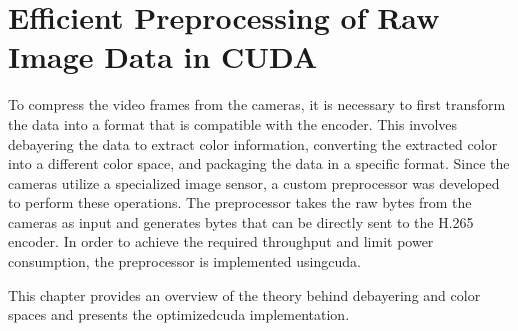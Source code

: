 \chapter{Efficient Preprocessing of Raw Image Data in CUDA}
\label{chap:debayer}

To compress the video frames from the cameras, it is necessary to first transform the data into a format that is compatible with the encoder.
This involves debayering the data to extract color information, converting the extracted color into a different color space, and packaging the data in a specific format.
Since the cameras utilize a specialized image sensor, a custom preprocessor was developed to perform these operations.
The preprocessor takes the raw bytes from the cameras as input and generates bytes that can be directly sent to the H.265 encoder.
In order to achieve the required throughput and limit power consumption, the preprocessor is implemented using\gls{cuda}.

This chapter provides an overview of the theory behind debayering and color spaces and presents the optimized\gls{cuda} implementation.

